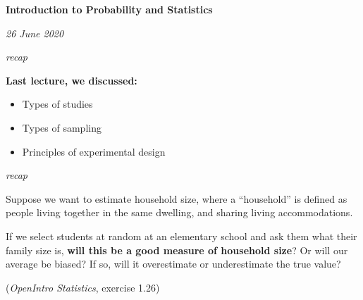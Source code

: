 \documentclass[ignorenonframetext,]{beamer}
\author{Peter Gao}
\date{6/17/2020}
\begin{document}
\begin{frame}{}
\protect\hypertarget{section}{}

\vspace{4em}
\Large{\textbf{Introduction to Probability and Statistics}}

\vspace{3em}
\footnotesize

\textit{26 June 2020}

\end{frame}

\begin{frame}[standout]{}
\protect\hypertarget{section-1}{}

\color{apricot}\textit{\gar\Huge recap}

\normalsize\color{white}\vspace{4ex}\textbf{ Last lecture, we discussed:}

\vspace{2ex}
\begin{itemize}
\color{white}
\setlength{\itemsep}{2ex}
\item Types of studies
\item Types of sampling
\item Principles of experimental design
\end{itemize}

\end{frame}

\begin{frame}[standout]{}
\protect\hypertarget{section-2}{}

\color{apricot}\textit{\gar\Huge recap}

\scriptsize \color{white}
\vspace{4ex}

Suppose we want to estimate household size, where a ``household'' is
defined as people living together in the same dwelling, and sharing
living accommodations.

\vspace{2ex}

If we select students at random at an elementary school and ask them
what their family size is,
\textbf{will this be a good measure of household size}? Or will our
average be biased? If so, will it overestimate or underestimate the true
value?

\vspace{2ex}

\hfill(\textit{OpenIntro Statistics}, exercise 1.26)

\end{frame}
\end{document}
